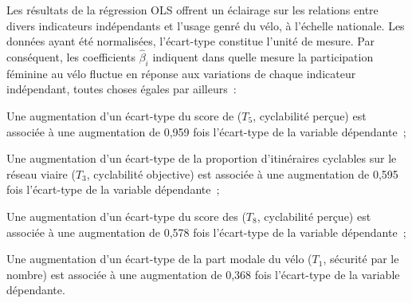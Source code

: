 \begin{refsegment}
Les résultats de la régression \acrshort{OLS} offrent un éclairage sur les relations entre divers indicateurs indépendants et l'usage genré du vélo, à l'échelle nationale. Les données ayant été normalisées, l'écart-type constitue l'unité de mesure. Par conséquent, les coefficients $\hat{\beta}_{i}$ indiquent dans quelle mesure la participation féminine au vélo fluctue en réponse aux variations de chaque indicateur indépendant, toutes choses égales par ailleurs~:
\begin{customitemize}
    \item Une augmentation d'un écart-type du score de  (\(T_{5}\), cyclabilité perçue) est associée à une augmentation de 0,959 fois l'écart-type de la variable dépendante~;
    \item Une augmentation d'un écart-type de la proportion d'itinéraires cyclables sur le réseau viaire (\(T_{3}\), cyclabilité objective) est associée à une augmentation de 0,595 fois l'écart-type de la variable dépendante~;
    \item Une augmentation d'un écart-type du score des  (\(T_{8}\), cyclabilité perçue) est associée à une augmentation de 0,578 fois l'écart-type de la variable dépendante~;
    \item Une augmentation d'un écart-type de la part modale du vélo (\(T_{1}\), sécurité par le nombre) est associée à une augmentation de 0,368 fois l'écart-type de la variable dépendante.
\end{customitemize}%


\end{refsegment}
